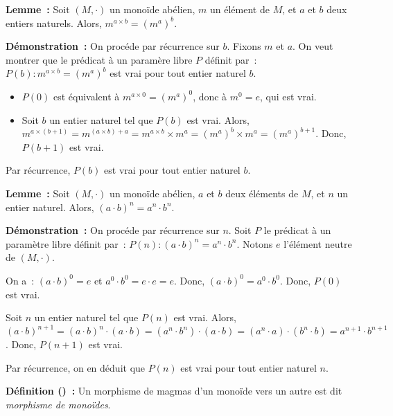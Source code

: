     \done

\medskip

\noindent\textbf{Lemme :} Soit $(M,\cdot)$ un monoïde abélien, $m$ un élément de $M$, et $a$ et $b$ deux entiers naturels. 
    Alors, $m^{a \times b} = (m^a)^b$.

\medskip

\noindent\textbf{Démonstration :} On procéde par récurrence sur $b$.
    Fixons $m$ et $a$.
    On veut montrer que le prédicat à un paramère libre $P$ définit par : $P(b): m^{a \times b} = (m^a)^b$ est vrai pour tout entier naturel $b$.
    \begin{itemize}[nosep]
        \item $P(0)$ est équivalent à $m^{a \times 0} = (m^a)^0$, donc à $m^0 = e$, qui est vrai.
        \item Soit $b$ un entier naturel tel que $P(b)$ est vrai. 
            Alors, $m^{a \times (b+1)} = m^{(a \times b) + a} = m^{a \times b} \times m^a = (m^a)^b \times m^a = (m^a)^{b+1}$.
            Donc, $P(b+1)$ est vrai.
    \end{itemize}
    Par récurrence, $P(b)$ est vrai pour tout entier naturel $b$.

    \done

\medskip

\noindent\textbf{Lemme :} Soit $(M, \cdot)$ un monoïde abélien, $a$ et $b$ deux éléments de $M$, et $n$ un entier naturel. 
    Alors, $(a \cdot b)^n = a^n \cdot b^n$.

\medskip

\noindent\textbf{Démonstration :} On procéde par récurrence sur $n$.
    Soit $P$ le prédicat à un paramètre libre définit par : $P(n): (a \cdot b)^n = a^n \cdot b^n$.
    Notons $e$ l'élément neutre de $(M, \cdot)$.

    On a : $(a \cdot b)^0 = e$ et $a^0 \cdot b^0 = e \cdot e = e$.
    Donc, $(a \cdot b)^0 = a^0 \cdot b^0$.
    Donc, $P(0)$ est vrai.

    Soit $n$ un entier naturel tel que $P(n)$ est vrai. 
    Alors, $(a \cdot b)^{n+1} = (a \cdot b)^n \cdot (a \cdot b) = (a^n \cdot b^n) \cdot (a \cdot b) = (a^n \cdot a) \cdot (b^n \cdot b) = a^{n+1} \cdot b^{n+1}$.
    Donc, $P(n+1)$ est vrai.

    Par récurrence, on en déduit que $P(n)$ est vrai pour tout entier naturel $n$.

    \done

\medskip

\noindent\textbf{Définition () :} Un morphisme de magmas d'un monoïde vers un autre est dit \textit{morphisme de monoïdes}.

